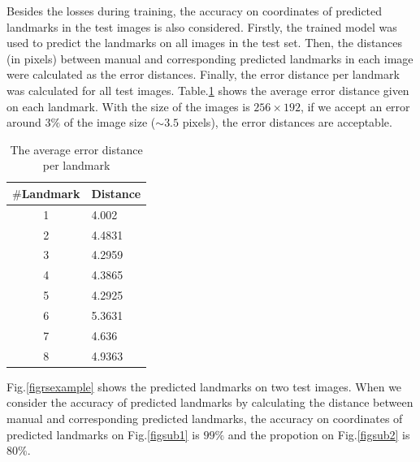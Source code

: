 \documentclass[10pt]{article}
\begin{document}
Besides the losses during training, the accuracy on coordinates of predicted landmarks in the test images is also considered. Firstly, the trained model was used to predict the landmarks on all images in the test set. Then, the distances (in pixels) between manual and corresponding predicted landmarks in each image were calculated as the error distances. Finally, the error distance per landmark was calculated for all test images. Table.\ref{tabledistance} shows the average error distance given on each landmark. With the size of the images is $256 \times 192$, if we accept an error around $3\%$ of the image size ($ \sim3.5$ pixels), the error distances are acceptable.

\begin{table}[htbp]
\centering
\begin{tabular}{|c|p{1.5cm}|}
\hline
\textbf{$\#$Landmark} & \textbf{Distance} \\ \hline
1 & 4.002  \\ \hline
2 & 4.4831 \\ \hline
3 & 4.2959 \\ \hline
4 & 4.3865 \\ \hline
5 & 4.2925 \\ \hline
6 & 5.3631 \\ \hline
7 & 4.636 \\ \hline
8 & 4.9363 \\ \hline
\end{tabular}
\caption{The average error distance per landmark}
\label{tabledistance}
\end{table}
Fig.\ref{figrsexample} shows the predicted landmarks on two test images. When we consider the accuracy of predicted landmarks by calculating the distance between manual and corresponding predicted landmarks, the accuracy on coordinates of predicted landmarks on Fig.\ref{figsub1} is $99\%$ and the propotion on Fig.\ref{figsub2} is $80\%$.
\end{document}

